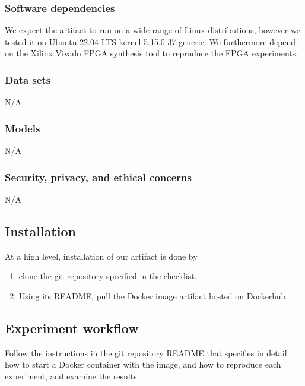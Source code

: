 \documentclass[letterpaper,twocolumn,10pt]{article}
\begin{document}
{\subsubsection{Software dependencies}

We expect the artifact to run on a wide range of Linux distributions,
however we tested it on Ubuntu 22.04 LTS kernel 5.15.0-37-generic. We
furthermore depend on the Xilinx Vivado FPGA synthesis tool to reproduce
the FPGA experiments.

\subsubsection{Data sets}

N/A

\subsubsection{Models}

N/A

\subsubsection{Security, privacy, and ethical concerns}

N/A

\subsection{Installation}

At a high level, installation of our artifact is done by
\begin{enumerate}
    \item clone the git repository specified in the checklist.
    \item Using its README, pull the Docker image artifact
        hosted on Dockerhub.
\end{enumerate}

\subsection{Experiment workflow}

Follow the instructions in the git repository README that specifies
in detail how to start a Docker container with the image, and how to
reproduce each experiment, and examine the results.

}
\end{document}
